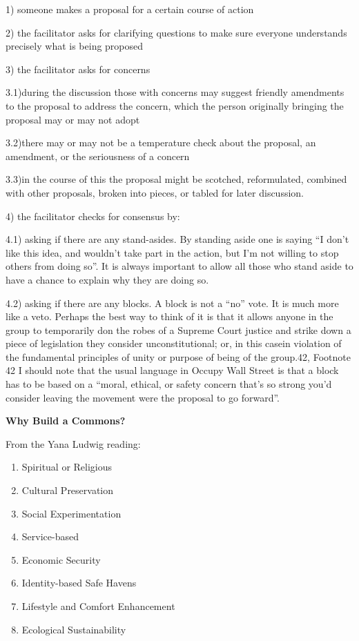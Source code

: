\documentclass{article}
\begin{document}
1) someone makes a proposal for a certain course of action

2) the facilitator asks for clarifying questions to make sure everyone understands precisely what is being proposed

3) the facilitator asks for concerns

3.1)during the discussion those with concerns may suggest friendly amendments to the proposal to address the concern, which the person originally bringing the proposal may or may not adopt

3.2)there may or may not be a temperature check about the proposal, an amendment, or the seriousness of a concern

3.3)in the course of this the proposal might be scotched, reformulated, combined with other proposals, broken into pieces, or tabled for later discussion.

4) the facilitator checks for consensus by:

4.1) asking if there are any stand-asides. By standing aside one is saying “I don’t like this idea, and wouldn’t take part in the action, but I’m not willing to stop others from doing so”. It is always important to allow all those who stand aside to have a chance to explain why they are doing so.

4.2) asking if there are any blocks. A block is not a “no” vote. It is much more like a veto. Perhaps the best way to think of it is that it allows anyone in the group to temporarily don the robes of a Supreme Court justice and strike down a piece of legislation they consider unconstitutional; or, in this casein violation of the fundamental principles of unity or purpose of being of the group.{42},
Footnote {42} I should note that the usual language in Occupy Wall Street is that a block has to be based on a “moral, ethical, or safety concern that’s so strong you’d consider leaving the movement were the proposal to go forward”.

\pagebreak
{\huge \textbf{Why Build a Commons?}}

From the Yana Ludwig reading:

\begin{enumerate}
	\item Spiritual or Religious
	\item 	Cultural Preservation
	\item 	Social Experimentation
	\item 	Service-based
	\item 	Economic Security
	\item 	Identity-based Safe Havens
	\item 	Lifestyle and Comfort Enhancement
	\item 	Ecological Sustainability
\end{enumerate}
\end{document}

